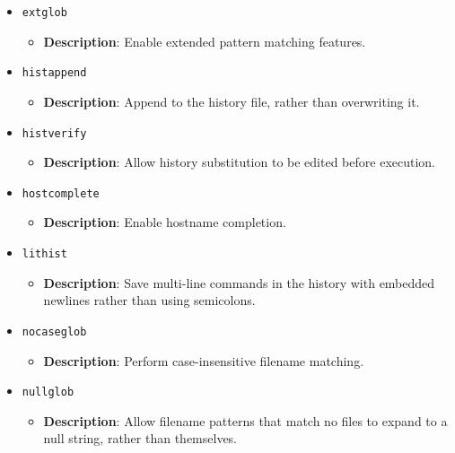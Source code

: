 \documentclass{report}
\begin{document}
\begin{itemize}
    \item \texttt{extglob}
        \begin{itemize}
            \item \textbf{Description}: Enable extended pattern matching features.
        \end{itemize}

    \item \texttt{histappend}
        \begin{itemize}
            \item \textbf{Description}: Append to the history file, rather than overwriting it.
        \end{itemize}

    \item \texttt{histverify}
        \begin{itemize}
            \item \textbf{Description}: Allow history substitution to be edited before execution.
        \end{itemize}

    \item \texttt{hostcomplete}
        \begin{itemize}
            \item \textbf{Description}: Enable hostname completion.
        \end{itemize}

    \item \texttt{lithist}
        \begin{itemize}
            \item \textbf{Description}: Save multi-line commands in the history with embedded newlines rather than using semicolons.
        \end{itemize}

    \item \texttt{nocaseglob}
        \begin{itemize}
            \item \textbf{Description}: Perform case-insensitive filename matching.
        \end{itemize}

    \item \texttt{nullglob}
        \begin{itemize}
            \item \textbf{Description}: Allow filename patterns that match no files to expand to a null string, rather than themselves.
        \end{itemize}


\end{itemize}
\end{document}
